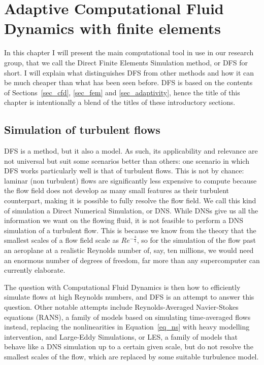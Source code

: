 \chapter[Adaptive CFD]{Adaptive Computational Fluid Dynamics with finite elements}
\label{cha_adaptiveCFD}
In this chapter I will present the main computational tool in use in our research group, that we call the Direct Finite Elements Simulation method, or DFS for short.
I will explain what distinguishes DFS from other methods and how it can be much cheaper than what has been seen before.
DFS is based on the contents of Sections~\ref{sec_cfd}, \ref{sec_fem} and \ref{sec_adaptivity}, hence the title of this chapter is intentionally a blend of the titles of these introductory sections.

\section{Simulation of turbulent flows}
\label{sec_turbulentFlows}
DFS is a method, but it also a model.
As such, its applicability and relevance are not universal but suit some scenarios better than others: one scenario in which DFS works particularly well is that of turbulent flows.
This is not by chance: laminar (non turbulent) flows are significantly less expensive to compute because the flow field does not develop as many small features as their turbulent counterpart, making it is possible to fully resolve the flow field.
We call this kind of simulation a Direct Numerical Simulation, or DNS.
While DNSs give us all the information we want on the flowing fluid, it is not feasible to perform a DNS simulation of a turbulent flow.
This is because we know from the theory that the smallest scales of a flow field scale as \(Re^{-\frac{3}{4}}\), so for the simulation of the flow past an aeroplane at a realistic Reynolds number of, say, ten millions, we would need an enormous number of degrees of freedom, far more than any supercomputer can currently elaborate.

The question with Computational Fluid Dynamics is then how to efficiently simulate flows at high Reynolds numbers, and DFS is an attempt to answer this question.
Other notable attempts include Reynolds-Averaged Navier-Stokes equations (RANS), a family of models based on simulating time-averaged flows instead, replacing the nonlinearities in Equation~\eqref{eq_ns} with heavy modelling intervention, and Large-Eddy Simulations, or LES, a family of models that behave like a DNS simulation up to a certain given scale, but do not resolve the smallest scales of the flow, which are replaced by some suitable turbulence model.

